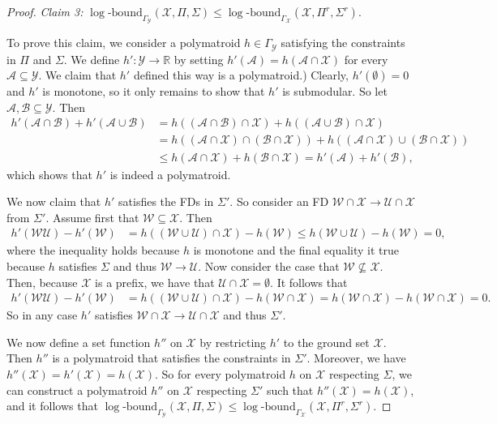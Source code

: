 \documentclass[a4paper,cleveref]{lipics-v2021}
\newcommand{\logb}{\mathrm{\log\text{-}bound}}
\newcommand{\vset}[1]{\mathcal{#1}}
\begin{document}
\begin{proof}
\smallskip
	 
\emph{Claim 3:}
$\logb_{\Gamma_{\vset Y}}(\vset X, \Pi, \Sigma) \le \logb_{\Gamma_{\vset X}}(\vset X, \Pi^r, \Sigma^r)$.

To prove this claim, we consider a polymatroid $h\in \Gamma_{\vset Y}$ satisfying the constraints in $\Pi$ and $\Sigma$. We define $h': \vset Y\rightarrow \mathbb{R}$ by setting  $h'(\vset A) = h(\vset A\cap \vset X)$ for every $\vset A\subseteq \vset Y$.
%
%
We claim that $h'$ defined this way is a polymatroid.)
Clearly, $h'(\emptyset) = 0$ and $h'$ is monotone, so it only remains to show that $h'$ is submodular. So let $\vset A, \vset B\subseteq \vset Y$. Then 
	\begin{align*}
		h'(\vset A \cap \vset B) + h'(\vset A \cup \vset B) & = h((\vset A \cap \vset B)\cap \vset X) + h((\vset A \cup \vset B)\cap \vset X)\\
		&= h((\vset A \cap \vset X)\cap (\vset B\cap \vset X)) + h((\vset A \cap \vset X) \cup (\vset B\cap \vset X))\\
		&\le h(\vset A \cap \vset X) + h(\vset B\cap \vset X)%
		= h'(\vset A) + h'(\vset B),
	\end{align*}
	which shows that $h'$ is indeed a polymatroid.
	
	We now claim that $h'$ satisfies the FDs in $\Sigma'$. So consider an FD $\vset W\cap \vset X \rightarrow \vset U\cap \vset X$ from $\Sigma'$. Assume first that $\vset W\subseteq \vset X$. Then 
	\begin{align*}
		h'(\vset W\vset U) - h'(\vset W) & = h((\vset W \cup \vset U)\cap \vset X) - h(\vset W)%
		\le h(\vset W\cup \vset U) - h(\vset W)%
		= 0,
	\end{align*}
	where the inequality holds because $h$ is monotone and the final equality it true because $h$ satisfies $\Sigma$ and thus $\vset W \rightarrow \vset U$. Now consider the case that $\vset W \nsubseteq \vset X$. Then, because $\vset X$ is a prefix, we have that $\vset U \cap \vset X = \emptyset$. It follows that 
	\begin{align*}
	h'(\vset W\vset U) - h'(\vset W) & = h((\vset W \cup \vset U)\cap \vset X) - h(\vset W\cap \vset X)%
	= h(\vset W \cap \vset X) - h(\vset W\cap \vset X)%
	= 0.
	\end{align*}
	So in any case $h'$ satisfies $\vset W\cap \vset X \rightarrow \vset U \cap \vset X$ and thus $\Sigma'$.
	
	We now define a set function $h''$ on $\vset X$ by restricting $h'$ to the ground set $\vset X$. Then $h''$ is a polymatroid that satisfies the constraints in $\Sigma'$. Moreover, we have $h''(\vset X) = h'(\vset X) = h(\vset X)$. So for every polymatroid $h$ on $\vset X$ respecting $\Sigma$, we can construct a polymatroid $h''$ on $\vset X$ respecting $\Sigma'$ such that $h''(\vset X) = h(\vset X)$, and it follows that $\logb_{\Gamma_{\vset Y}}(\vset X, \Pi, \Sigma) \le \logb_{\Gamma_{\vset X}}(\vset X, \Pi^r, \Sigma^r)$.


\end{proof}
\end{document}
